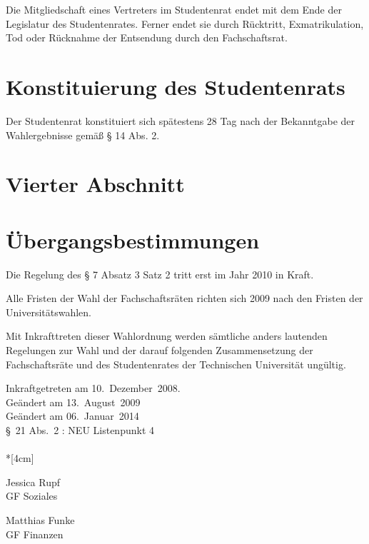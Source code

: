 \begin{multicols}{2}
\Abs \Satz Die Mitgliedschaft eines Vertreters im Studentenrat endet mit dem Ende der Legislatur des Studentenrates. Ferner endet sie durch Rücktritt, Exmatrikulation, Tod oder Rücknahme der Entsendung durch den Fachschaftsrat.

\section{Konstituierung des Studentenrats}
\Abs \Satz Der Studentenrat konstituiert sich spätestens 28 Tag nach der Bekanntgabe der Wahlergebnisse gemäß § 14 Abs. 2.

\section*{Vierter Abschnitt}
\section{Übergangsbestimmungen}
\Abs \Satz Die Regelung des § 7 Absatz 3 Satz 2 tritt erst im Jahr 2010 in Kraft.

\Abs \Satz Alle Fristen der Wahl der Fachschaftsräten richten sich 2009 nach den Fristen der Universitätswahlen.

\Abs \Satz Mit Inkrafttreten dieser Wahlordnung werden sämtliche anders lautenden Regelungen zur Wahl und der darauf folgenden Zusammensetzung der Fachschaftsräte und des Studentenrates der Technischen Universität ungültig.
\end{multicols}
\nopagebreak
\vspace{1cm}
Inkraftgetreten am 10.~Dezember~2008.
\\ 
  

\footnotesize
Geändert am 13.~August~2009\\

Geändert am 06.~Januar~2014\\
§~21 Abs.~2 : NEU Listenpunkt 4\\

\normalsize
~\\*[4cm]
\begin{center}
\hspace*{\fill}
\parbox{7cm}{Jessica Rupf\\GF Soziales}
\hfill\parbox{7cm}{Matthias Funke\\GF Finanzen}
\hspace*{\fill}
\end{center}     
